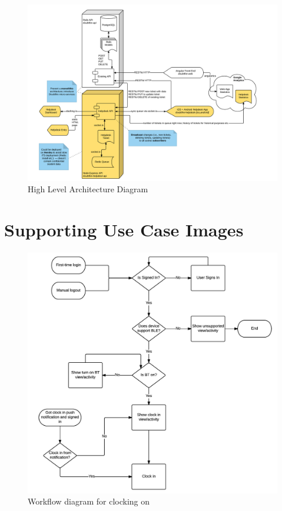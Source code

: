 \documentclass[12pt,a4paper,]{article}
\begin{document}
\begin{figure}[p]
  \includegraphics[angle=90, width=\textwidth]{8a0213b6-9fb0-4153-bd40-de3e6deebbff.png}
  \caption{High Level Architecture Diagram}
  \label{hla}
\end{figure}

\newpage

\appendix

\section{Supporting Use Case Images}
\label{sec:Supporting Images}

\begin{figure}[h!]
  \centering
  \includegraphics{b26d932a-a9db-4f4d-bb69-fb76f54ac074.jpeg}
  \caption{Workflow diagram for clocking on}
  \label{wd}
\end{figure}
\end{document}
